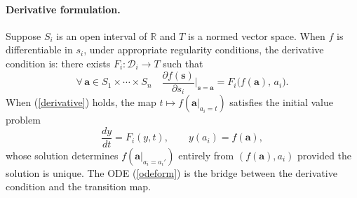 \documentclass{article}
\theoremstyle{definition}
\theoremstyle{remark}
\begin{document}
\paragraph{Derivative formulation.} Suppose $S_i$ is an open interval of $\mathbb{R}$ and $T$ is a normed vector space. When $f$ is differentiable in $s_i$, under appropriate regularity conditions, the derivative condition is: there exists $F_i \colon \mathcal{D}_i \to T$ such that
\begin{equation}
\label{derivative}
\forall\, \boldsymbol{a} \in S_1 \times \cdots \times S_n \quad
\frac{\partial f(\boldsymbol{s})}{\partial s_i}\bigg|_{\boldsymbol{s} = \boldsymbol{a}} = F_i\bigl(f(\boldsymbol{a}),\, a_i\bigr).
\end{equation}
When (\ref{derivative}) holds, the map $t \mapsto f(\boldsymbol{a}|_{a_i = t})$ satisfies the initial value problem
\begin{equation}
\label{odeform}
\frac{dy}{dt} = F_i(y, t), \qquad y(a_i) = f(\boldsymbol{a}),
\end{equation}
whose solution determines $f(\boldsymbol{a}|_{a_i = a_i'})$ entirely from $(f(\boldsymbol{a}), a_i)$ provided the solution is unique. The ODE (\ref{odeform}) is the bridge between the derivative condition and the transition map.
\end{document}
